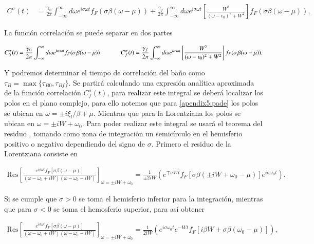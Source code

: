 \begin{appendixs}
\begin{align*}
    C^{\sigma}(t) & = \frac{\gamma_{0}}{2\pi} \int_{-\infty}^{\infty}d\omega e^{i\sigma \omega t} f_{F}(\sigma \beta (\omega-\mu)) + \frac{\gamma_{f}}{2\pi} \int_{-\infty}^{\infty}d\omega e^{i\sigma \omega t}\left[ \frac{W^{2}}{(\omega-\epsilon_{0})^{2} + W^{2}} \right] f_{F}(\sigma \beta (\omega-\mu)),
\end{align*}

La función correlación se puede separar en dos partes

\begin{equation*}
    C^{\sigma}_{0}(t) = \frac{\gamma_{0}}{2\pi} \int_{-\infty}^{\infty}d\omega e^{i\sigma \omega t} f_{F}(\sigma \beta (\omega-\mu)) \hspace{12mm} C^{\sigma}_{f}(t) = \frac{\gamma_{f}}{2\pi} \int_{-\infty}^{\infty}d\omega e^{i\sigma \omega t}\left[ \frac{W^{2}}{(\omega-\epsilon_{0})^{2} + W^{2}} \right] f_{F}(\sigma \beta (\omega-\mu)),
\end{equation*}

Y podremos determinar el tiempo de correlación del baño como $\tau_{B} = \max\{\tau_{B0},\tau_{Bf}\}$. Se partirá calculando una expresión analítica aproximada de la función correlación $C^{\sigma}_{f}(t)$, para realizar este integral se deberá localizar los polos en el plano complejo, para ello notemos que para \ref{apendix5:pade} los polos se ubican en $\omega = \pm i \xi_{l}/\beta + \mu $. Mientras que para la Lorentziana los polos se ubican en $\omega = \pm i W + \omega_{0}$. Para poder realizar este integral se usará el teorema del residuo \cite{riley2006mathematical}, tomando como zona de integración un semicírculo en el hemisferio positivo o negativo dependiendo del signo de $\sigma$. Primero el residuo de la Lorentziana consiste en 

\begin{align*}
   \text{Res} \left[ \frac{e^{ i\sigma \omega t} f_{F}[\sigma \beta (\omega-\mu)] }{ (\omega-\omega_{0} + iW)(\omega -\omega_{0} -iW)}\right]_{\omega = \pm i W + \omega_{0}} = \frac{1}{\pm 2iW} ( e^{\mp \sigma Wt} f_{F}[\sigma \beta(\pm iW +\omega_{0}-\mu)]e^{i\sigma \omega_{0}t}). 
\end{align*}

Si se cumple que $\sigma > 0$ se toma el hemisferio inferior para la integración, mientras que para $\sigma<0$ se toma el hemosferio superior, para así obtener 

\begin{align*}
    \text{Res} \left[ \frac{e^{ i\sigma \omega t} f_{F}[\sigma \beta (\omega-\mu)] }{ (\omega-\omega_{0} + iW)(\omega -\omega_{0} -iW)}\right]_{\omega = \pm i W + \omega_{0}} = \frac{1}{ 2iW} ( e^{i\sigma \omega_{0}t}e^{- Wt} f_{F}[i\beta W + \sigma \beta(\omega_{0}-\mu)]), 
 \end{align*}


\end{appendixs}
